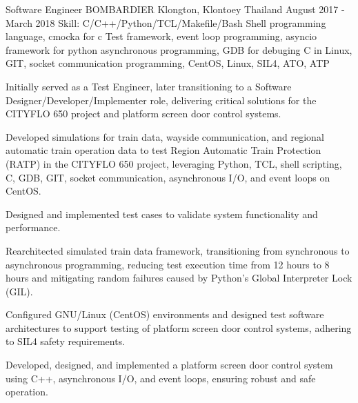 \begin{cventries}
  \cventry
    {Software Engineer} %
    {BOMBARDIER} %
    {Klongton, Klontoey Thailand} %
    {August 2017 - March 2018} %
    {Skill: C/C++/Python/TCL/Makefile/Bash Shell programming language, cmocka
    for c Test framework, event loop programming,
    asyncio framework for python asynchronous programming,
    GDB for debuging C in Linux, GIT, socket communication
    programming, CentOS, Linux, SIL4, ATO, ATP } %
    {
      \begin{cvitems} %
      \item {Initially served as a Test Engineer, later transitioning to a Software Designer/Developer/Implementer role, delivering critical solutions for the CITYFLO 650 project and platform screen door control systems.}
      \item {Developed simulations for train data, wayside communication, and regional automatic train operation data to test Region Automatic Train Protection (RATP) in the CITYFLO 650 project, leveraging Python, TCL, shell scripting, C, GDB, GIT, socket communication, asynchronous I/O, and event loops on CentOS.}
      \item {Designed and implemented test cases to validate system functionality and performance.}
      \item {Rearchitected simulated train data framework, transitioning from synchronous to asynchronous programming, reducing test execution time from 12 hours to 8 hours and mitigating random failures caused by Python’s Global Interpreter Lock (GIL).}
      \item {Configured GNU/Linux (CentOS) environments and designed test software architectures to support testing of platform screen door control systems, adhering to SIL4 safety requirements.}
      \item {Developed, designed, and implemented a platform screen door control system using C++, asynchronous I/O, and event loops, ensuring robust and safe operation.}
      \end{cvitems}
    }


\end{cventries}
